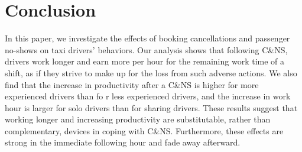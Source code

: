 \documentclass[reviewmode,AEJ]{AEA}
\begin{document}




\section{Conclusion}
\label{sec:conclude}
In this paper, we investigate the effects of booking cancellations and passenger no-shows on taxi 
drivers' behaviors. Our analysis shows that following C\&NS, drivers work longer and earn more per hour
for the remaining work time of a shift, as if they strive to make up for the loss from such adverse actions. 
We also find that the increase in productivity after a C\&NS is higher for more experienced drivers than fo
r less experienced drivers, and the increase in work hour is larger for solo drivers than for sharing drivers.
These results suggest that working longer and increasing productivity are substitutable, rather than 
complementary, devices in coping with C\&NS. Furthermore, these effects are strong in the immediate 
following hour and fade away afterward.
\end{document}
